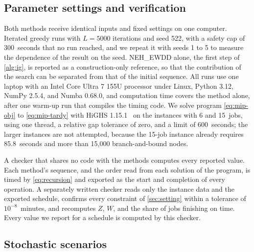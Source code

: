 \subsection{Parameter settings and verification}\label{sec:settings}

\sumpara Both methods receive identical inputs and fixed settings on one computer. \sumparaend
\fin Iterated greedy runs with $L = 5000$ iterations and seed 522, with a safety cap of 300~seconds that no run reached, and we repeat it with seeds 1 to 5 to measure the dependence of the result on the seed. \fine
\fin NEH\_EWDD alone, the first step of \cref{alg:ig}, is reported as a construction-only reference, so that the contribution of the search can be separated from that of the initial sequence. \fine
\fin All runs use one laptop with an Intel Core Ultra 7 155U processor under Linux, Python 3.12, NumPy 2.5.4, and Numba 0.68.0, and computation time covers the method alone, after one warm-up run that compiles the timing code. \fine
\fin We solve program \eqref{eq:mip-obj} to \eqref{eq:mip-tardy} with HiGHS 1.15.1~\cite{highs} on the instances with 6 and 15~jobs, using one thread, a relative gap tolerance of zero, and a limit of 600~seconds; the larger instances are not attempted, because the 15-job instance already requires 85.8~seconds and more than 15,000 branch-and-bound nodes. \fine

\sumpara A checker that shares no code with the methods computes every reported value. \sumparaend
\fin Each method's sequence, and the order read from each solution of the program, is timed by \eqref{eq:recursion} and exported as the start and completion of every operation. \fine
\fin A separately written checker reads only the instance data and the exported schedule, confirms every constraint of \cref{sec:setting} within a tolerance of $10^{-8}$~minutes, and recomputes $Z$, $W$, and the share of jobs finishing on time. \fine
\fin Every value we report for a schedule is computed by this checker. \fine

\subsection{Stochastic scenarios}\label{sec:stress-design}

